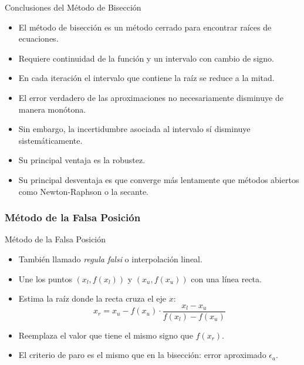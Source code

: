 \documentclass[../../main.tex]{subfiles}
\begin{document}
\begin{frame}{Conclusiones del Método de Bisección}

\begin{itemize}

    \item El método de bisección es un método cerrado para encontrar raíces de ecuaciones.

    \item Requiere continuidad de la función y un intervalo con cambio de signo.

    \item En cada iteración el intervalo que contiene la raíz se reduce a la mitad.

    \item El error verdadero de las aproximaciones no necesariamente disminuye de manera monótona.

    \item Sin embargo, la incertidumbre asociada al intervalo sí disminuye sistemáticamente.

    \item Su principal ventaja es la robustez.

    \item Su principal desventaja es que converge más lentamente que métodos abiertos como Newton-Raphson o la secante.

\end{itemize}

\end{frame}

\subsubsection{Método de la Falsa Posición}
\begin{frame}{Método de la Falsa Posición}
\begin{itemize}
  \item También llamado \textit{regula falsi} o interpolación lineal.
  \item Une los puntos \( (x_l, f(x_l)) \) y \( (x_u, f(x_u)) \) con una línea recta.
  \item Estima la raíz donde la recta cruza el eje \( x \):
  \[
    x_r = x_u - f(x_u) \cdot \frac{x_l - x_u}{f(x_l) - f(x_u)}
  \]
  \item Reemplaza el valor que tiene el mismo signo que \( f(x_r) \).
  \item El criterio de paro es el mismo que en la bisección: error aproximado \( \epsilon_a \).
\end{itemize}
\end{frame}
\end{document}
